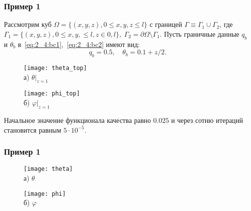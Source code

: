 \begin{frame}
    \frametitle{Пример 1}
    Рассмотрим куб $\Omega = \{ (x, y, z), 0 \leq x,y,z \leq l \}$ с границей
    $\Gamma \equiv \Gamma_1 \cup \Gamma_2$, где
    $
    \Gamma_1 = \{(x, y, z), 0 \leq x,y, \leq l, z \in 0, l\}, \;
    \Gamma_2 = \partial \Omega \setminus \Gamma_1.
    $
    Пусть граничные данные $q_b$ и $\theta_b$ в~\eqref{eq:2_4:bc1},~\eqref{eq:2_4:bc2} имеют вид:
    \[ q_b = 0.5, \quad \theta_b = 0.1 + z/2. \]

    \begin{figure}[h!t]
        \begin{minipage}[b][][b]{0.49\linewidth}
            \centering
            \texttt{[image: theta\_top]}
            \\ а) $\theta|_{z=1}$
        \end{minipage}
        \hfill
        \begin{minipage}[b][][b]{0.49\linewidth}
            \centering
            \texttt{[image: phi\_top]}
            \\ б) $\varphi|_{z=1}$
        \end{minipage}
        \label{fig:4_4:5}
    \end{figure}


    Начальное значение функционала качества равно $0.025$ и
    через сотню итераций становится равным $5\cdot 10^{-5}$.
\end{frame}

\begin{frame}
    \frametitle{Пример 1}
    \begin{figure}[h!t]
        \begin{minipage}[b][][b]{0.49\linewidth}
            \centering
            \texttt{[image: theta]}
            \\ а) $\theta$
        \end{minipage}
        \hfill
        \begin{minipage}[b][][b]{0.49\linewidth}
            \centering
            \texttt{[image: phi]}
            \\ б) $\varphi$
        \end{minipage}
        \label{fig:4_4:5}
    \end{figure}
\end{frame}


